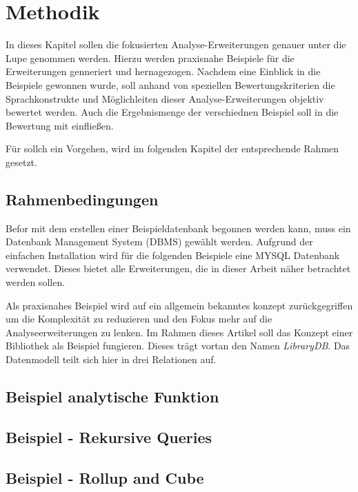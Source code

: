\chapter{Methodik}
In dieses Kapitel sollen die fokusierten Analyse-Erweiterungen genauer unter die
Lupe genommen werden. Hierzu werden praxisnahe Beispiele für die Erweiterungen
genneriert und hernagezogen. Nachdem eine Einblick in die Beispiele gewonnen wurde,
soll anhand von speziellen Bewertungskriterien die Sprachkonstrukte und
Möglichleiten dieser Analyse-Erweiterungen objektiv bewertet werden. Auch die Ergebnismenge
der verschiednen Beispiel soll in die Bewertung mit einfließen.

Für sollch ein Vorgehen, wird im folgenden Kapitel der entsprechende Rahmen
gesetzt.

\section{Rahmenbedingungen}
Befor mit dem erstellen einer Beispieldatenbank begonnen werden kann, muss ein Datenbank
Management System (DBMS) gewählt werden. Aufgrund der einfachen Installation
wird für die folgenden Beispiele eine MYSQL Datenbank verwendet. Dieses bietet alle
Erweiterungen, die in dieser Arbeit näher betrachtet werden sollen.

Als praxisnahes Beispiel wird auf ein allgemein bekanntes konzept
zurückgegriffen um die Komplexität zu reduzieren und den Fokus mehr auf die
Analyseerweiterungen zu lenken. Im Rahmen dieses Artikel soll das Konzept einer Bibliothek
als Beispiel fungieren. Dieses trägt vortan den Namen \textit{LibraryDB}. Das
Datenmodell teilt sich hier in drei Relationen auf.

\section{Beispiel analytische Funktion}

\section{Beispiel - Rekursive Queries}

\section{Beispiel - Rollup and Cube}
